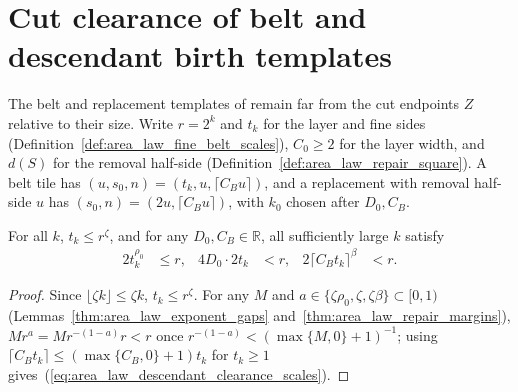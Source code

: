 \section{Cut clearance of belt and descendant birth templates}
\label{sec:area_law_descendant_cut_clearance}

The belt and replacement templates of \cite[Section~11]{OpenAI2026AreaLaw}
remain far from the cut endpoints $Z$ relative to their size. Write $r=2^k$ and
$t_k$ for the layer and fine sides (Definition~\ref{def:area_law_fine_belt_scales}),
$C_0\ge2$ for the layer width, and $d(S)$ for the removal half-side
(Definition~\ref{def:area_law_repair_square}). A belt tile has
$(u,s_0,n)=(t_k,u,\lceil C_Bu\rceil)$, and a replacement with removal half-side
$u$ has $(s_0,n)=(2u,\lceil C_Bu\rceil)$, with $k_0$ chosen after $D_0,C_B$.


\begin{lemma}
    \label{thm:area_law_descendant_clearance_scales}
    \leanok
    For all $k$, $t_k\le r^\zeta$, and for any $D_0,C_B\in\mathbb R$, all
    sufficiently large $k$ satisfy
    \begin{align}
        2t_k^{\rho_0}              & \le r, &
        4D_0\cdot2t_k              & <r,    &
        2\lceil C_Bt_k\rceil^\beta & <r.
        \label{eq:area_law_descendant_clearance_scales}
    \end{align}
\end{lemma}
\begin{proof}\leanok
    Since $\lfloor\zeta k\rfloor\le\zeta k$, $t_k\le r^\zeta$. For any $M$ and
    $a\in\{\zeta\rho_0,\zeta,\zeta\beta\}\subset[0,1)$
    (Lemmas~\ref{thm:area_law_exponent_gaps} and~\ref{thm:area_law_repair_margins}),
    $Mr^a=Mr^{-(1-a)}r<r$ once $r^{-(1-a)}<(\max\{M,0\}+1)^{-1}$; using
    $\lceil C_Bt_k\rceil\le(\max\{C_B,0\}+1)t_k$ for $t_k\ge1$ gives~(\ref{eq:area_law_descendant_clearance_scales}).
\end{proof}

